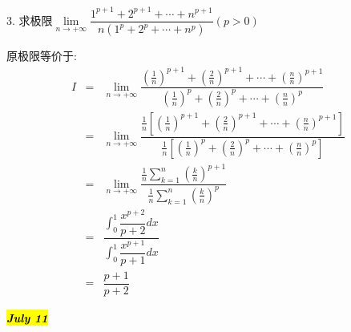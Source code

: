 3. 求极限$\lim\limits_{n\rightarrow +\infty}\dfrac{1^{p+1}+2^{p+1}+\cdots+n^{p+1}}{n(1^p+2^p+\cdots+n^p)}(p>0)$
\begin{solution}
	
	原极限等价于: 
	\begin{eqnarray*}
		I&=&\lim\limits_{n\rightarrow +\infty}\dfrac{(\frac{1}{n})^{p+1}+(\frac{2}{n})^{p+1}+\cdots+(\frac{n}{n})^{p+1}}{(\frac{1}{n})^{p}+(\frac{2}{n})^{p}+\cdots+(\frac{n}{n})^{p}}\\
		&=&\lim\limits_{n\rightarrow +\infty}\dfrac{\frac{1}{n}[(\frac{1}{n})^{p+1}+(\frac{2}{n})^{p+1}+\cdots+(\frac{n}{n})^{p+1}]}{\frac{1}{n}[(\frac{1}{n})^{p}+(\frac{2}{n})^{p}+\cdots+(\frac{n}{n})^{p}]}\\
		&=&\lim\limits_{n\rightarrow +\infty}\dfrac{\frac{1}{n}\sum\limits_{k=1}^{n}(\frac{k}{n})^{p+1}}{\frac{1}{n}\sum\limits_{k=1}^{n}(\frac{k}{n})^{p}}\\
		&=&\dfrac{\int_{0}^{1}\dfrac{x^{p+2}}{p+2}dx}{\int_{0}^{1}\dfrac{x^{p+1}}{p+1}dx}\\
		&=&\dfrac{p+1}{p+2}
	\end{eqnarray*}
\end{solution}

\hl{\textbf{\textit{July 11}}}

